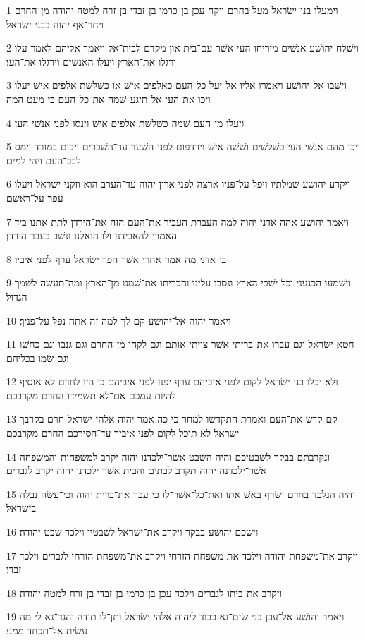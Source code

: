 \par 1 וימעלו בני־ישׂראל מעל בחרם ויקח עכן בן־כרמי בן־זבדי בן־זרח למטה יהודה מן־החרם ויחר־אף יהוה בבני ישׂראל׃
\par 2 וישׁלח יהושׁע אנשׁים מיריחו העי אשׁר עם־בית און מקדם לבית־אל ויאמר אליהם לאמר עלו ורגלו את־הארץ ויעלו האנשׁים וירגלו את־העי׃
\par 3 וישׁבו אל־יהושׁע ויאמרו אליו אל־יעל כל־העם כאלפים אישׁ או כשׁלשׁת אלפים אישׁ יעלו ויכו את־העי אל־תיגע־שׁמה את־כל־העם כי מעט המה׃
\par 4 ויעלו מן־העם שׁמה כשׁלשׁת אלפים אישׁ וינסו לפני אנשׁי העי׃
\par 5 ויכו מהם אנשׁי העי כשׁלשׁים ושׁשׁה אישׁ וירדפום לפני השׁער עד־השׁברים ויכום במורד וימס לבב־העם ויהי למים׃
\par 6 ויקרע יהושׁע שׂמלתיו ויפל על־פניו ארצה לפני ארון יהוה עד־הערב הוא וזקני ישׂראל ויעלו עפר על־ראשׁם׃
\par 7 ויאמר יהושׁע אהה אדני יהוה למה העברת העביר את־העם הזה את־הירדן לתת אתנו ביד האמרי להאבידנו ולו הואלנו ונשׁב בעבר הירדן׃
\par 8 בי אדני מה אמר אחרי אשׁר הפך ישׂראל ערף לפני איביו׃
\par 9 וישׁמעו הכנעני וכל ישׁבי הארץ ונסבו עלינו והכריתו את־שׁמנו מן־הארץ ומה־תעשׂה לשׁמך הגדול׃
\par 10 ויאמר יהוה אל־יהושׁע קם לך למה זה אתה נפל על־פניך׃
\par 11 חטא ישׂראל וגם עברו את־בריתי אשׁר צויתי אותם וגם לקחו מן־החרם וגם גנבו וגם כחשׁו וגם שׂמו בכליהם׃
\par 12 ולא יכלו בני ישׂראל לקום לפני איביהם ערף יפנו לפני איביהם כי היו לחרם לא אוסיף להיות עמכם אם־לא תשׁמידו החרם מקרבכם׃
\par 13 קם קדשׁ את־העם ואמרת התקדשׁו למחר כי כה אמר יהוה אלהי ישׂראל חרם בקרבך ישׂראל לא תוכל לקום לפני איביך עד־הסירכם החרם מקרבכם׃
\par 14 ונקרבתם בבקר לשׁבטיכם והיה השׁבט אשׁר־ילכדנו יהוה יקרב למשׁפחות והמשׁפחה אשׁר־ילכדנה יהוה תקרב לבתים והבית אשׁר ילכדנו יהוה יקרב לגברים׃
\par 15 והיה הנלכד בחרם ישׂרף באשׁ אתו ואת־כל־אשׁר־לו כי עבר את־ברית יהוה וכי־עשׂה נבלה בישׂראל׃
\par 16 וישׁכם יהושׁע בבקר ויקרב את־ישׂראל לשׁבטיו וילכד שׁבט יהודה׃
\par 17 ויקרב את־משׁפחת יהודה וילכד את משׁפחת הזרחי ויקרב את־משׁפחת הזרחי לגברים וילכד זבדי׃
\par 18 ויקרב את־ביתו לגברים וילכד עכן בן־כרמי בן־זבדי בן־זרח למטה יהודה׃
\par 19 ויאמר יהושׁע אל־עכן בני שׂים־נא כבוד ליהוה אלהי ישׂראל ותן־לו תודה והגד־נא לי מה עשׂית אל־תכחד ממני׃
